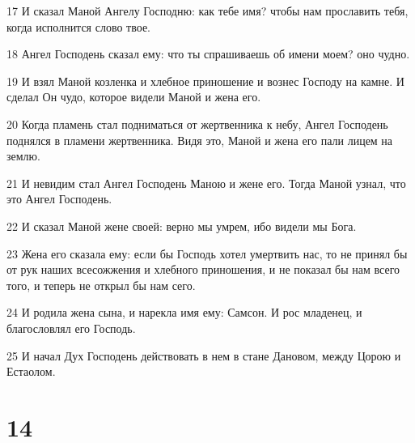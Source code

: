 \par 17 И сказал Маной Ангелу Господню: как тебе имя? чтобы нам прославить тебя, когда исполнится слово твое.
\par 18 Ангел Господень сказал ему: что ты спрашиваешь об имени моем? оно чудно.
\par 19 И взял Маной козленка и хлебное приношение и вознес Господу на камне. И сделал Он чудо, которое видели Маной и жена его.
\par 20 Когда пламень стал подниматься от жертвенника к небу, Ангел Господень поднялся в пламени жертвенника. Видя это, Маной и жена его пали лицем на землю.
\par 21 И невидим стал Ангел Господень Маною и жене его. Тогда Маной узнал, что это Ангел Господень.
\par 22 И сказал Маной жене своей: верно мы умрем, ибо видели мы Бога.
\par 23 Жена его сказала ему: если бы Господь хотел умертвить нас, то не принял бы от рук наших всесожжения и хлебного приношения, и не показал бы нам всего того, и теперь не открыл бы нам сего.
\par 24 И родила жена сына, и нарекла имя ему: Самсон. И рос младенец, и благословлял его Господь.
\par 25 И начал Дух Господень действовать в нем в стане Дановом, между Цорою и Естаолом.

\chapter{14}

